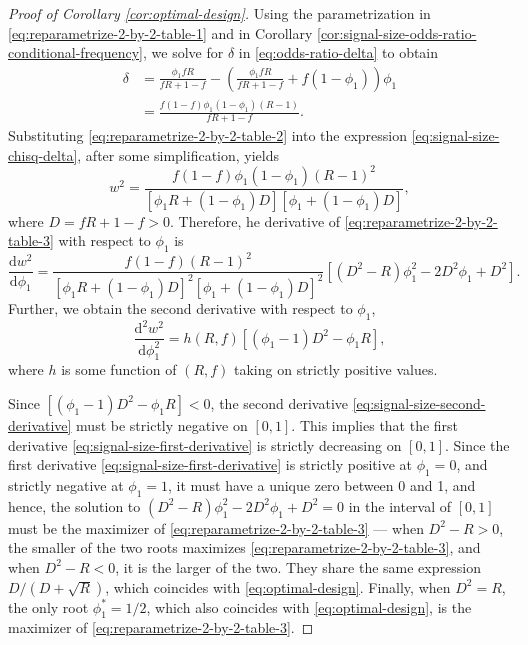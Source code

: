 \begin{proof}[Proof of Corollary \ref{cor:optimal-design}]
Using the parametrization in \eqref{eq:reparametrize-2-by-2-table-1} and in Corollary \ref{cor:signal-size-odds-ratio-conditional-frequency}, we solve for $\delta$ in \eqref{eq:odds-ratio-delta} to obtain
\begin{align}
    \delta &= \frac{\phi_1 fR}{fR+1-f} - \left(\frac{\phi_1 fR}{fR+1-f} + f(1-\phi_1)\right)\phi_1 \nonumber \\
    &= \frac{f(1-f)\phi_1(1-\phi_1)(R-1)}{fR+1-f}. \label{eq:reparametrize-2-by-2-table-2}
\end{align}
Substituting \eqref{eq:reparametrize-2-by-2-table-2} into the expression \eqref{eq:signal-size-chisq-delta}, after some simplification, yields
\begin{equation} \label{eq:reparametrize-2-by-2-table-3}
    w^2 = \frac{f(1-f)\phi_1(1-\phi_1)(R-1)^2}{\left[\phi_1 R + (1-\phi_1)D\right]\left[\phi_1 + (1-\phi_1)D\right]},
\end{equation}
where $D = fR+1-f > 0$.
Therefore, he derivative of \eqref{eq:reparametrize-2-by-2-table-3} with respect to $\phi_1$ is
\begin{equation} \label{eq:signal-size-first-derivative}
    \frac{\mathrm{d}w^2}{\mathrm{d}\phi_1} = 
    \frac{f(1-f)(R-1)^2}{\left[\phi_1 R+(1-\phi_1)D\right]^2 \left[\phi_1+(1-\phi_1)D\right]^2} \left[(D^2-R)\phi_1^2 - 2D^2\phi_1 + D^2\right].
\end{equation}
Further, we obtain the second derivative with respect to $\phi_1$,
\begin{equation} \label{eq:signal-size-second-derivative}
    \frac{\mathrm{d}^2w^2}{\mathrm{d}\phi_1^2} = 
    h(R,f) \left[(\phi_1-1)D^2 - \phi_1R\right],
\end{equation}
where $h$ is some function of $(R,f)$ taking on strictly positive values.

Since $\left[(\phi_1-1)D^2 - \phi_1R\right]<0$, the second derivative \eqref{eq:signal-size-second-derivative} must be strictly negative on $[0,1]$.
This implies that the first derivative \eqref{eq:signal-size-first-derivative} is strictly decreasing on $[0,1]$. 
Since the first derivative \eqref{eq:signal-size-first-derivative} is strictly positive at $\phi_1=0$, and strictly negative at $\phi_1=1$, it must have a unique zero between 0 and 1, and hence, the solution to $(D^2-R)\phi_1^2 - 2D^2\phi_1 + D^2 = 0$ in the interval of $[0,1]$ must be the maximizer of \eqref{eq:reparametrize-2-by-2-table-3} --- when $D^2-R>0$, the smaller of the two roots maximizes \eqref{eq:reparametrize-2-by-2-table-3}, and when $D^2-R<0$, it is the larger of the two.
They share the same expression ${D}/{(D+\sqrt{R})}$, which coincides with \eqref{eq:optimal-design}.
Finally, when $D^2=R$, the only root $\phi_1^*=1/2$, which also coincides with \eqref{eq:optimal-design}, is the maximizer of \eqref{eq:reparametrize-2-by-2-table-3}.
\end{proof}
